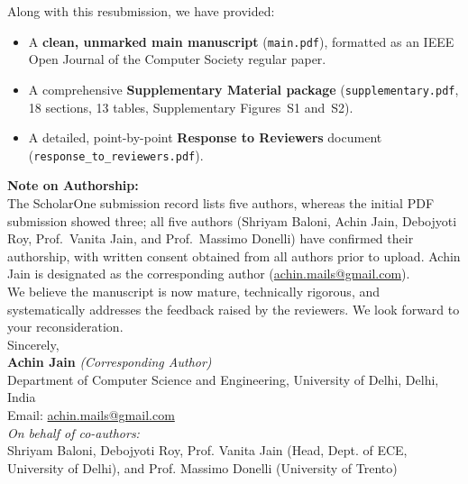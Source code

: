 \documentclass[11pt,a4paper]{article}
\begin{document}
\noindent Along with this resubmission, we have provided:
\begin{itemize}[leftmargin=*]
    \item A \textbf{clean, unmarked main manuscript} (\texttt{main.pdf}), formatted as an IEEE Open Journal of the Computer Society regular paper.
    \item A comprehensive \textbf{Supplementary Material package} (\texttt{supplementary.pdf}, 18 sections, 13 tables, Supplementary Figures~S1 and~S2).
    \item A detailed, point-by-point \textbf{Response to Reviewers} document (\texttt{response\_to\_reviewers.pdf}).
\end{itemize}

\noindent\textbf{Note on Authorship:}\\
The ScholarOne submission record lists five authors, whereas the initial PDF submission showed three; all five authors (Shriyam Baloni, Achin Jain, Debojyoti Roy, Prof.~Vanita Jain, and Prof.~Massimo Donelli) have confirmed their authorship, with written consent obtained from all authors prior to upload. Achin Jain is designated as the corresponding author (\href{mailto:achin.mails@gmail.com}{achin.mails@gmail.com}).\\[0.8em]

\noindent We believe the manuscript is now mature, technically rigorous, and systematically addresses the feedback raised by the reviewers. We look forward to your reconsideration.\\[1.5em]

\noindent Sincerely,\\[1em]
\textbf{Achin Jain} \textit{(Corresponding Author)}\\
Department of Computer Science and Engineering, University of Delhi, Delhi, India\\
Email: \href{mailto:achin.mails@gmail.com}{achin.mails@gmail.com}\\[0.5em]
\textit{On behalf of co-authors:}\\
Shriyam Baloni, Debojyoti Roy, Prof. Vanita Jain (Head, Dept. of ECE, University of Delhi), and Prof. Massimo Donelli (University of Trento)
\end{document}
